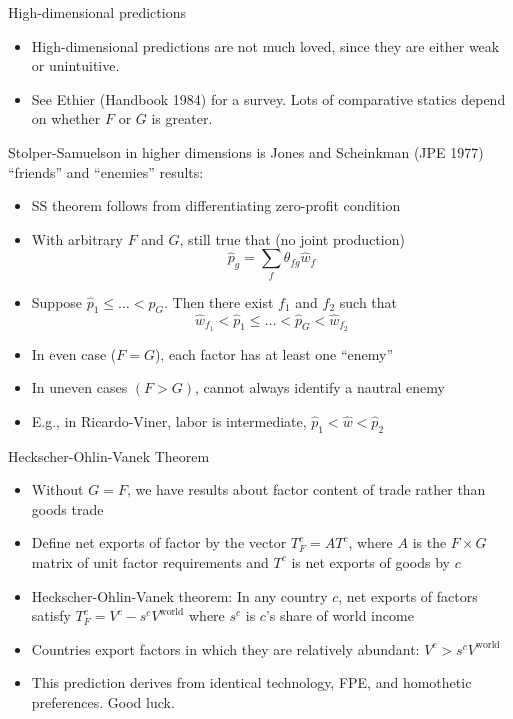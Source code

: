 \documentclass[10pt,notes=hide]{beamer}
\begin{document}
\begin{frame}{High-dimensional predictions}
\begin{itemize}
	\item High-dimensional predictions are not much loved, since they are either weak or unintuitive.
	\item See Ethier (Handbook 1984) for a survey. Lots of comparative statics depend on whether $F$ or $G$ is greater.
\end{itemize}
Stolper-Samuelson in higher dimensions is Jones and Scheinkman (JPE 1977) ``friends'' and ``enemies'' results:
\begin{itemize}
	\item SS theorem follows from differentiating zero-profit condition
	\item With arbitrary $F$ and $G$, still true that (no joint production)
	\begin{equation*}
		\hat{p}_g = \sum_f \theta_{fg} \hat{w}_f
	\end{equation*}
	\item Suppose $\hat{p}_1 \leq \dots < \hat{p}_G$. 
	Then there exist $f_1$ and $f_2$ such that 
	\begin{equation*}
		\hat{w}_{f_1} <  \hat{p}_1 \leq \dots < \hat{p}_G < \hat{w}_{f_2}
	\end{equation*}
	\item In even case ($F=G$), each factor has at least one ``enemy''
	\item In uneven cases $(F>G)$, cannot always identify a nautral enemy
	\item[] E.g., in Ricardo-Viner, labor is intermediate, $\hat{p}_1 < \hat{w} < \hat{p}_2$
\end{itemize}
\end{frame}
\begin{frame}{Heckscher-Ohlin-Vanek Theorem}
\begin{itemize}
	\item Without $G=F$, we have results about factor content of trade rather than goods trade
	\item Define net exports of factor by the vector $T_{F}^{c} = AT^c$, where $A$ is the $F \times G$ matrix of unit factor requirements and $T^c$ is net exports of goods by $c$
	\item Heckscher-Ohlin-Vanek theorem: In any country $c$, net exports of factors satisfy $T_F^c = V^c - s^c V^{\text{world}}$ where $s^c$ is $c$'s share of world income
	\item Countries export factors in which they are relatively abundant: $V^c > s^c V^{\text{world}}$ 
	\item This prediction derives from identical technology, FPE, and homothetic preferences.
	Good luck.
\end{itemize}
\end{frame}
\end{document}
